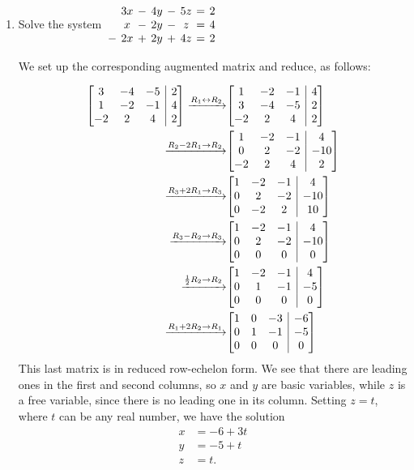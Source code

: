 \documentclass[12pt]{article}
\makeatletter
\newcommand{\points}[1]{\marginpar{\hspace{24pt}[#1]}}
\newenvironment{amatrix}[1]{%
  \left[\begin{array}{@{}*{#1}{c}|c@{}}
}{%
  \end{array}\right]
}
\newcommand{\bam}{\begin{amatrix}}
\newcommand{\eam}{\end{amatrix}}
\makeatother
\begin{document}
\begin{enumerate}
\pagebreak

\item Solve the system \hspace{12pt} $\arraycolsep=2pt \begin{array}{cccccccc}&3x&-&4y&-&5z&=&2\\
 &x&-&2y&-&z&=&4\\
-&2x&+&2y&+&4z&=&2\end{array}$ \points{8}

\bigskip

We set up the corresponding augmented matrix and reduce, as follows:

\begin{align*}
 \bam{3} 3&-4&-5&2\\1&-2&-1&4\\-2&2&4&2\eam \xrightarrow{R_1\leftrightarrow R_2} &\bam{3}1&-2&-1&4\\3&-4&-5&2\\-2&2&4&2\eam\\
\xrightarrow{R_2-2R_1\to R_2}&\bam{3}1&-2&-1&4\\0&2&-2&-10\\-2&2&4&2\eam\\
\xrightarrow{R_3+2R_1\to R_3}&\bam{3}1&-2&-1&4\\0&2&-2&-10\\0&-2&2&10\eam\\
\xrightarrow{R_3-R_2\to R_3}&\bam{3}1&-2&-1&4\\0&2&-2&-10\\0&0&0&0\eam\\
\xrightarrow{\frac{1}{2}R_2\to R_2}&\bam{3}1&-2&-1&4\\0&1&-1&-5\\0&0&0&0\eam\\
\xrightarrow{R_1+2R_2\to R_1}&\bam{3}1&0&-3&-6\\0&1&-1&-5\\0&0&0&0\eam
\end{align*}
This last matrix is in reduced row-echelon form. We see that there are leading ones in the first and second columns, so $x$ and $y$ are basic variables, while $z$ is a free variable, since there is no leading one in its column. Setting $z=t$, where $t$ can be any real number, we have the solution
\begin{align*}
 x&=-6+3t\\y&=-5+t\\z&=t.
\end{align*}

\end{enumerate}
\end{document}
